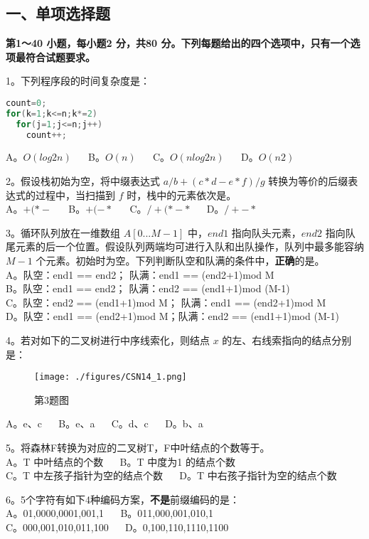 
\subsection{一、单项选择题}
\textbf{第1～40 小题，每小题2 分，共80 分。下列每题给出的四个选项中，只有一个选项最符合试题要求。}

1。下列程序段的时间复杂度是：
\begin{lstlisting}[language=cpp]
count=0;
for(k=1;k<=n;k*=2)
  for(j=1;j<=n;j++)
    count++;
\end{lstlisting}
A。$O(log2n)$ $\quad$ B。$O(n)$ $\quad$ C。$O(nlog2n)$ $\quad$ D。$O(n2)$

2。假设栈初始为空，将中缀表达式 $a/b+(c*d-e*f)/g$ 转换为等价的后缀表达式的过程中，当扫描到 $f$ 时，栈中的元素依次是。 \\
A。$+ ( * -$  $\quad$ B。$+ ( - *$  $\quad$ C。$/ + ( * - *$  $\quad$ D。$/ + - *$

3。循环队列放在一维数组 $A[0...M-1]$ 中，$end1$ 指向队头元素，$end2$ 指向队尾元素的后一个位置。假设队列两端均可进行入队和出队操作，队列中最多能容纳 $M-1$ 个元素。初始时为空。下列判断队空和队满的条件中，\textbf{正确}的是。 \\
A。队空：end1 == end2； 队满：end1 == (end2+1)mod M \\
B。队空：end1 == end2； 队满：end2 == (end1+1)mod (M-1) \\
C。队空：end2 == (end1+1)mod M； 队满：end1 == (end2+1)mod M \\
D。队空：end1 == (end2+1)mod M；队满：end2 == (end1+1)mod (M-1)

4。若对如下的二叉树进行中序线索化，则结点 $x$ 的左、右线索指向的结点分别是：
\begin{figure}[ht]
\centering
\texttt{[image: ./figures/CSN14\_1.png]}
\caption{第3题图} \label{CSN14_fig1}
\end{figure}
A。e、c $\quad$ B。e、a $\quad$ C。d、c $\quad$ D。b、a

5。将森林F转换为对应的二叉树T，F中叶结点的个数等于。 \\
A。T 中叶结点的个数 $\quad$ B。T 中度为1 的结点个数 \\
C。T 中左孩子指针为空的结点个数 $\quad$ D。T 中右孩子指针为空的结点个数

6。5个字符有如下4种编码方案，\textbf{不是}前缀编码的是： \\
A。01,0000,0001,001,1 $\quad$ B。011,000,001,010,1 \\
C。000,001,010,011,100 $\quad$ D。0,100,110,1110,1100

